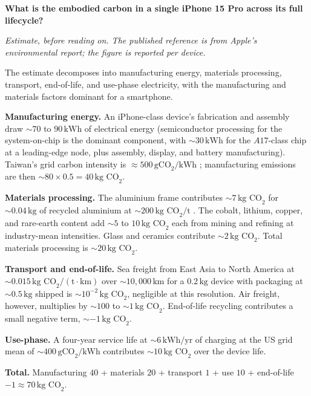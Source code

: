 \begin{estimation}
\textbf{What is the embodied carbon in a single iPhone 15 Pro
across its full lifecycle?}

\smallskip
\textit{Estimate, before reading on. The published reference is
from Apple's environmental report; the figure is reported per
device.}

\smallskip
The estimate decomposes into manufacturing energy, materials
processing, transport, end-of-life, and use-phase electricity,
with the manufacturing and materials factors dominant for a
smartphone.

\textbf{Manufacturing energy.} An iPhone-class device's
fabrication and assembly draw $\sim 70$ to $90 \,
\si{\kilo\watt\hour}$ of electrical energy (semiconductor
processing for the system-on-chip is the dominant component,
with $\sim 30 \,\si{\kilo\watt\hour}$ for the $A17$-class chip
at a leading-edge node, plus assembly, display, and battery
manufacturing). Taiwan's grid carbon intensity is $\approx 500
\,\text{gCO}_{2}/\text{kWh}$ \cite{data:ch09t3b-ember-2024};
manufacturing emissions are then $\sim 80 \times 0.5 = 40 \,
\text{kg CO}_{2}$.

\textbf{Materials processing.} The aluminium frame contributes
$\sim 7 \,\text{kg CO}_{2}$ for $\sim 0.04 \,\si{\kilo\gram}$
of recycled aluminium at $\sim 200 \,
\text{kg CO}_{2}/\text{t}$ \cite{data:ch09t3b-iai-aluminium-2023}.
The cobalt, lithium, copper, and rare-earth content add
$\sim 5$ to $10 \,\text{kg CO}_{2}$ each from mining and
refining at industry-mean intensities. Glass and ceramics
contribute $\sim 2 \,\text{kg CO}_{2}$. Total materials
processing is $\sim 20 \,\text{kg CO}_{2}$.

\textbf{Transport and end-of-life.} Sea freight from East Asia
to North America at $\sim 0.015 \,\text{kg CO}_{2}/(\text{t}\cdot\text{km})$
over $\sim 10{,}000 \,\si{\kilo\meter}$ for a $0.2 \,\si{\kilo\gram}$
device with packaging at $\sim 0.5 \,\si{\kilo\gram}$ shipped is
$\sim 10^{-2} \,\text{kg CO}_{2}$, negligible at this
resolution. Air freight, however, multiplies by $\sim 100$ to
$\sim 1 \,\text{kg CO}_{2}$. End-of-life recycling
contributes a small negative term, $\sim -1 \,
\text{kg CO}_{2}$.

\textbf{Use-phase.} A four-year service life at $\sim 6 \,
\si{\kilo\watt\hour}/\text{yr}$ of charging at the US grid mean
of $\sim 400 \,\text{gCO}_{2}/\text{kWh}$ contributes
$\sim 10 \,\text{kg CO}_{2}$ over the device life.

\textbf{Total.} Manufacturing $40$ + materials $20$ + transport
$1$ + use $10$ + end-of-life $-1 \approx 70 \,
\text{kg CO}_{2}$.


\end{estimation}
